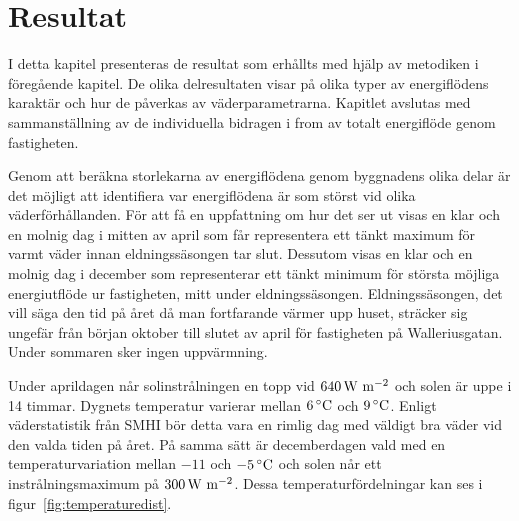 \chapter{Resultat}

I detta kapitel presenteras de resultat som erhållts med hjälp av metodiken i föregående kapitel. De olika delresultaten visar på olika typer av energiflödens karaktär och hur de påverkas av väderparametrarna. Kapitlet avslutas med sammanställning av de individuella bidragen i from av totalt energiflöde genom fastigheten.

Genom att beräkna storlekarna av energiflödena genom byggnadens olika delar är det möjligt att identifiera var energiflödena är som störst vid olika väderförhållanden. För att få en uppfattning om hur det ser ut visas en klar och en molnig dag i mitten av april som får representera ett tänkt maximum för varmt väder innan eldningssäsongen tar slut. Dessutom visas en klar och en molnig dag i december som representerar ett tänkt minimum för största möjliga energiutflöde ur fastigheten, mitt under eldningssäsongen. Eldningssäsongen, det vill säga den tid på året då man fortfarande värmer upp huset, sträcker sig ungefär från början oktober till slutet av april för fastigheten på Walleriusgatan. Under sommaren sker ingen uppvärmning.

Under aprildagen når solinstrålningen en topp vid $\unit[640]{W~m^{-2}}$ och solen är uppe i 14 timmar. Dygnets temperatur varierar mellan $\unit[6]{^\circ C}$ och $\unit[9]{^\circ C}$. Enligt väderstatistik från SMHI\cite{SMHIdata} bör detta vara en rimlig dag med väldigt bra väder vid den valda tiden på året. På samma sätt är decemberdagen vald med en temperaturvariation mellan $-11$ och $\unit[-5]{^\circ C}$ och solen når ett instrålningsmaximum på $\unit[300]{W~m^{-2}}$. Dessa temperaturfördelningar kan ses i figur~\ref{fig:temperaturedist}. 










